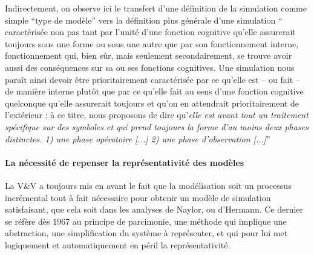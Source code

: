 Indirectement, on observe ici le transfert d'une définition de la simulation comme simple \enquote{type de modèle} vers la définition plus générale d'une simulation \enquote{ caractérisée non pas tant par l’unité d’une fonction cognitive qu’elle assurerait toujours sous une forme ou sous une autre que par son fonctionnement interne, fonctionnement qui, bien sûr, mais seulement secondairement, se trouve avoir aussi des conséquences sur sa ou ses fonctions cognitives. Une simulation nous paraît ainsi devoir être prioritairement caractérisée par ce qu’elle est – ou fait – de manière interne plutôt que par ce qu’elle fait au sens d’une fonction cognitive quelconque qu’elle assurerait toujours et qu’on en attendrait prioritairement de l’extérieur : à ce titre, nous proposons de dire qu’\textit{elle est avant tout un traitement spécifique sur des symboles et qui prend toujours la forme d'au moins deux phases distinctes. 1) une phase opératoire [...] 2) une phase d'observation [...]}} \autocite[33-34]{Varenne2013}

\paragraph{La nécessité de repenser la représentativité des modèles}

La V\&V a toujours mis en avant le fait que la modélisation soit un processus incrémental tout à fait nécessaire pour obtenir un modèle de simulation satisfaisant, que cela soit dans les analyses de Naylor, ou d'Hermann. Ce dernier se réfère dès 1967 au principe de parcimonie, une méthode qui implique une abstraction, une simplification du système à représenter, et qui pour lui met logiquement et automatiquement en péril la représentativité.  



